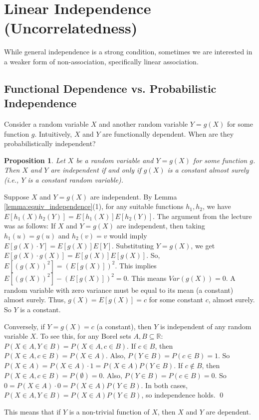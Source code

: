\documentclass[11pt]{article}
\newtheorem{proposition}[theorem]{Proposition}
\renewenvironment{proof}{{\bfseries Proof.}}{\qed\par\bigskip}
\begin{document}
\section{Linear Independence (Uncorrelatedness)}
While general independence is a strong condition, sometimes we are interested in a weaker form of non-association, specifically linear association.

\subsection{Functional Dependence vs. Probabilistic Independence}
Consider a random variable $X$ and another random variable $Y = g(X)$ for some function $g$. Intuitively, $X$ and $Y$ are functionally dependent. When are they probabilistically independent?

\begin{proposition}
Let $X$ be a random variable and $Y = g(X)$ for some function $g$. Then $X$ and $Y$ are independent if and only if $g(X)$ is a constant almost surely (i.e., $Y$ is a constant random variable).
\end{proposition}
\begin{proof}
Suppose $X$ and $Y=g(X)$ are independent. By Lemma \ref{lemma:equiv_independence}(1), for any suitable functions $h_1, h_2$, we have $E[h_1(X)h_2(Y)] = E[h_1(X)]E[h_2(Y)]$.
The argument from the lecture was as follows: If $X$ and $Y=g(X)$ are independent, then taking $h_1(u) = g(u)$ and $h_2(v)=v$ would imply $E[g(X) \cdot Y] = E[g(X)] E[Y]$. Substituting $Y=g(X)$, we get $E[g(X) \cdot g(X)] = E[g(X)] E[g(X)]$.
So, $E[(g(X))^2] = (E[g(X)])^2$.
This implies $E[(g(X))^2] - (E[g(X)])^2 = 0$.
This means $Var(g(X)) = 0$.
A random variable with zero variance must be equal to its mean (a constant) almost surely.
Thus, $g(X) = E[g(X)] = c$ for some constant $c$, almost surely. So $Y$ is a constant.

Conversely, if $Y=g(X)=c$ (a constant), then $Y$ is independent of any random variable $X$.
To see this, for any Borel sets $A, B \subseteq \mathbb{R}$:
$P(X \in A, Y \in B) = P(X \in A, c \in B)$.
If $c \in B$, then $P(X \in A, c \in B) = P(X \in A)$. Also, $P(Y \in B) = P(c \in B) = 1$. So $P(X \in A) = P(X \in A) \cdot 1 = P(X \in A) P(Y \in B)$.
If $c \notin B$, then $P(X \in A, c \in B) = P(\emptyset) = 0$. Also, $P(Y \in B) = P(c \in B) = 0$. So $0 = P(X \in A) \cdot 0 = P(X \in A) P(Y \in B)$.
In both cases, $P(X \in A, Y \in B) = P(X \in A)P(Y \in B)$, so independence holds.
\end{proof}
This means that if $Y$ is a non-trivial function of $X$, then $X$ and $Y$ are dependent.
\end{document}
